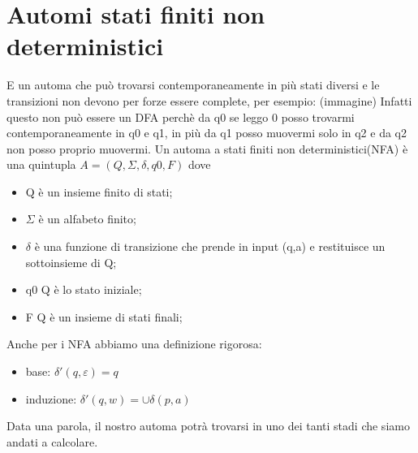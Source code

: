 \chapter{Automi stati finiti non deterministici}
E un automa che può trovarsi contemporaneamente in più stati diversi e le 
transizioni non devono per forze essere complete, per esempio: 
(immagine)
Infatti questo non può essere un DFA perchè da q0 se leggo 0 posso trovarmi
contemporaneamente in q0 e q1, in più da q1 posso muovermi solo in q2 e da q2
non posso proprio muovermi.
Un automa a stati finiti non deterministici(NFA) è una quintupla $A=(Q, \Sigma, \delta,
q0, F)$ dove
\begin{itemize}
\item Q è un insieme finito di stati;
\item $\Sigma$ è un alfabeto finito;
\item $\delta$ è una funzione di transizione che prende in input (q,a) e restituisce
un sottoinsieme di Q;
\item q0 \in Q è lo stato iniziale;
\item F \in Q è un insieme di stati finali;
\end{itemize}
Anche per i NFA abbiamo una definizione rigorosa:
\begin{itemize}
\item base: $\delta'(q, \varepsilon)={q}$
\item induzione: $\delta'(q,w)=\cup \delta(p,a)$
\end{itemize}
Data una parola, il nostro automa potrà trovarsi in uno dei tanti stadi
che siamo andati a calcolare.